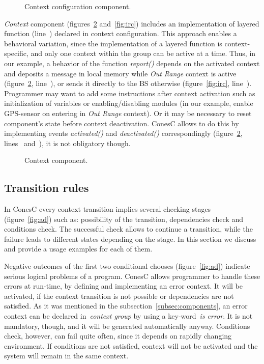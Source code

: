 
\begin{figure}[!h]
\TheSbox
\caption{Context configuration
component.}
\label{fig:ccc}
\end{figure}

\emph{Context} component (figures~\ref{fig:cc} and~\ref{fig:irc}) includes an
implementation of layered function (line~) declared in context configuration. 
This approach enables a behavioral variation, since the implementation of a layered function is
context-specific, and only one context within the group can be active at a time. Thus, in our
example, a behavior of the function \emph{report()} depends on the activated context and
deposits a message in local memory while \emph{Out Range} context
is active (figure~\ref{fig:cc}, line~),
or sends it directly to the BS otherwise (figure~\ref{fig:irc}, line~).
Programmer may want to add some instructions after
context activation such as initialization of variables or enabling/disabling
modules (in our example, enable GPS-sensor on entering in \emph{Out Range}
context). Or it may be necessary to reset component's state before context
deactivation. ConesC allows to do this by implementing events \emph{activated()} and
\emph{deactivated()} correspondingly (figure~\ref{fig:cc}, lines~
and~), it is not obligatory though.


\begin{figure}[!h]
\TheSbox
\caption{Context component.}
\label{fig:cc}
\end{figure}

\subsection{Transition rules}\label{subsec:rules}

In ConesC every context transition implies several checking stages (figure~\ref{fig:ad}) such as:
possibility of the transition, dependencies check and conditions check. The successful check allows
to continue a transition, while the failure leads to different states depending on the stage. In this
section we discuss and provide a usage examples for each of them. 

Negative outcomes of the first two conditional chooses (figure~\ref{fig:ad}) indicate
serious logical problems of a program. ConesC allows programmer to
handle these errors at run-time, by defining and implementing an error context. It will be activated,
if the context transition is not possible or dependencies are not satisfied. As it was mentioned in
the subsection~\ref{subsec:components}, an error context can be declared
in~\emph{context group} by using a key-word~\emph{is error}. It is not mandatory,
though, and it will be generated automatically anyway. Conditions check, however, can fail quite
often, since it depends on rapidly changing environment. If conditions are not
satisfied, context will not be activated and the system will remain in the same context. 


